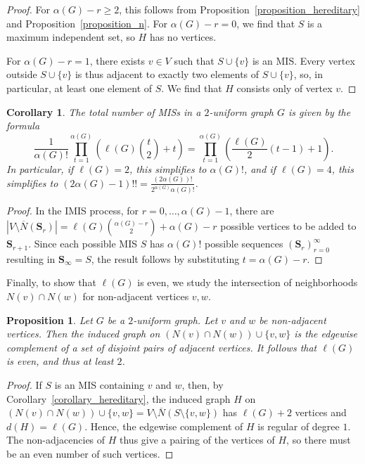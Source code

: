 \documentclass{article}
\theoremstyle{plain}
\theoremstyle{remark}
\theoremstyle{plain}
\newtheorem{corollary}[theorem]{Corollary}
\newtheorem{proposition}[theorem]{Proposition}
\numberwithin{equation}{section}
\begin{document}
	\begin{proof}
		For $\alpha(G)-r\geq2$, this follows from Proposition~\ref{proposition_hereditary} and Proposition~\ref{proposition_n}. For $\alpha(G)-r=0$, we find that $S$ is a maximum independent set, so $H$ has no vertices.
		
		For $\alpha(G)-r=1$, there exists $v\in V$ such that $S\cup\{v\}$ is an MIS. Every vertex outside $S\cup\{v\}$ is thus adjacent to exactly two elements of $S\cup\{v\}$, so, in particular, at least one element of $S$. We find that $H$ consists only of vertex $v$.
	\end{proof}
	
	\begin{corollary}\label{corollary_mis_count}
		The total number of MISs in a $2$-uniform graph $G$ is given by the formula $$\frac1{\alpha(G)!}\prod_{t=1}^{\alpha(G)}\left(\ell(G)\binom{t}{2}+t\right)=\prod_{t=1}^{\alpha(G)}\left(\frac{\ell(G)}{2}(t-1)+1\right).$$ In particular, if $\ell(G)=2$, this simplifies to $\alpha(G)!$, and if $\ell(G)=4$, this simplifies to $(2\alpha(G)-1)!!=\tfrac{(2\alpha(G))!}{2^{\alpha(G)}\alpha(G)!}$.
	\end{corollary}
	
	\begin{proof}
		In the IMIS process, for $r=0,\ldots,\alpha(G)-1$, there are $|V\setminus\overline{N}(\boldsymbol{S}_{r})|=\ell(G)\binom{\alpha(G)-r}{2}+\alpha(G)-r$ possible vertices to be added to $\boldsymbol{S}_{r+1}$. Since each possible MIS $S$ has $\alpha(G)!$ possible sequences $(\boldsymbol{S}_{r})_{r=0}^{\infty}$ resulting in $\boldsymbol{S}_{\infty}=S$, the result follows by substituting $t=\alpha(G)-r$.
	\end{proof}
	
	Finally, to show that $\ell(G)$ is even, we study the intersection of neighborhoods $N(v)\cap N(w)$ for non-adjacent vertices $v,w$.
	
	\begin{proposition}\label{proposition_even}
		Let $G$ be a $2$-uniform graph. Let $v$ and $w$ be non-adjacent vertices. Then the induced graph on $(N(v)\cap N(w))\cup\{v,w\}$ is the edgewise complement of a set of disjoint pairs of adjacent vertices. It follows that $\ell(G)$ is even, and thus at least $2$.
	\end{proposition}
	
	\begin{proof}
		If $S$ is an MIS containing $v$ and $w$, then, by Corollary~\ref{corollary_hereditary}, the induced graph $H$ on $(N(v)\cap N(w))\cup\{v,w\}=V\setminus\overline{N}(S\setminus\{v,w\})$ has $\ell(G)+2$ vertices and $d(H)=\ell(G)$. Hence, the edgewise complement of $H$ is regular of degree $1$. The non-adjacencies of $H$ thus give a pairing of the vertices of $H$, so there must be an even number of such vertices.
	\end{proof}
	
\end{document}
